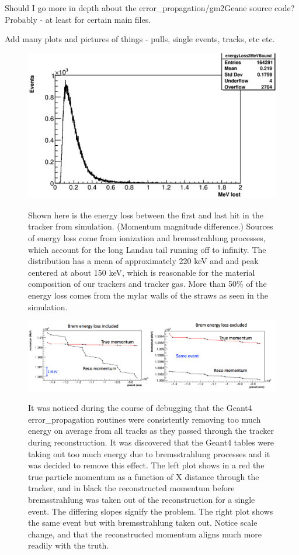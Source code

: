 \documentclass{article}
\begin{document}
Should I go more in depth about the error\_propagation/gm2Geane source code? Probably - at least for certain main files.


Add many plots and pictures of things - pulls, single events, tracks, etc etc.

\begin{figure}[]
\caption{Shown here is the energy loss between the first and last hit in the tracker from simulation. (Momentum magnitude difference.) Sources of energy loss come from ionization and bremsstrahlung processes, which account for the long Landau tail running off to infinity. The distribution has a mean of approximately 220 keV and and peak centered at about 150 keV, which is reasonable for the material composition of our trackers and tracker gas. More than 50\% of the energy loss comes from the mylar walls of the straws as seen in the simulation.}
\centering
\includegraphics[width=1.0\textwidth]{eLoss}
\label{fig:eLoss}
\end{figure}

\begin{figure}[]
\caption{It was noticed during the course of debugging that the Geant4 error\_propagation routines were consistently removing too much energy on average from all tracks as they passed through the tracker during reconstruction. It was discovered that the Geant4 tables were taking out too much energy due to bremsstrahlung processes and it was decided to remove this effect. The left plot shows in a red the true particle momentum as a function of X distance through the tracker, and in black the reconstructed momentum before bremsstrahlung was taken out of the reconstruction for a single event. The differing slopes signify the problem. The right plot shows the same event but with bremsstrahlung taken out. Notice scale change, and that the reconstructed momentum aligns much more readily with the truth.}
\centering
\includegraphics[width=1.0\textwidth]{bremComparison}
\label{fig:bremComparison}
\end{figure}
\end{document}
